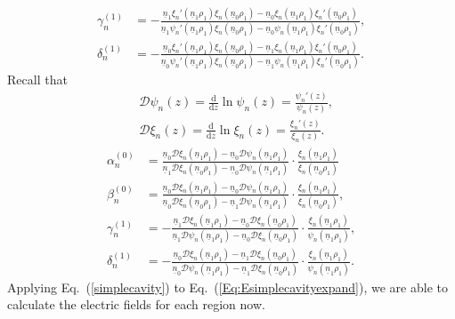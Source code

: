 \documentclass[journal=jacsat,manuscript=article,layout=traditional]{achemso}
\newcommand{\nr}{\underline{n}}
\begin{document}
\begin{appendix}
\begin{subequations}
\begin{align}
        \gamma_n^{(1)} &=-
        \frac{\nr_1\xi_n'(\nr_1\rho_1)\xi_n(\nr_0\rho_1)-\nr_0\xi_n(\nr_1\rho_1)\xi_n'(\nr_0\rho_1)}
        {\nr_1\psi_n'(\nr_1\rho_1)\xi_n(\nr_0\rho_1)-\nr_0\psi_n(\nr_1\rho_1)\xi_n'(\nr_0\rho_1)},\\
        \delta_n^{(1)} &=-
        \frac{\nr_0\xi_n'(\nr_1\rho_1)\xi_n(\nr_0\rho_1)-\nr_1\xi_n(\nr_1\rho_1)\xi_n'(\nr_0\rho_1)}
        {\nr_0\psi_n'(\nr_1\rho_1)\xi_n(\nr_0\rho_1)-\nr_1\psi_n(\nr_1\rho_1)\xi_n'(\nr_0\rho_1)}.
    \end{align}
    \label{simplecavity}%
\end{subequations}
Recall that 
\begin{subequations}
    \begin{align}
        &\mathcal{D}\psi_n(z) = \frac{\mathrm{d}}{\mathrm{d}z}\ln{\psi_n(z)} = \frac{\psi_n'(z)}{\psi_n(z)},\\
        &\mathcal{D}\xi_n(z) = \frac{\mathrm{d}}{\mathrm{d}z}\ln{\xi_n(z)} = \frac{\xi_n'(z)}{\xi_n(z)}.
    \end{align}%
\end{subequations}
\begin{subequations}
    \begin{align}
        \alpha_n^{(0)} &=
        \frac{\nr_0\mathcal{D}\xi_n(\nr_1\rho_1)-\nr_0\mathcal{D}\psi_n(\nr_1\rho_1)}
        {\nr_1\mathcal{D}\xi_n(\nr_0\rho_1)-\nr_0\mathcal{D}\psi_n(\nr_1\rho_1)}\cdot\frac{\xi_n(\nr_1\rho_1)}{\xi_n(\nr_0\rho_1)}\\
        \beta_n^{(0)} &=
        \frac{\nr_0\mathcal{D}\xi_n(\nr_1\rho_1)-\nr_0\mathcal{D}\psi_n(\nr_1\rho_1)}
        {\nr_0\mathcal{D}\xi_n(\nr_0\rho_1)-\nr_1\mathcal{D}\psi_n(\nr_1\rho_1)}\cdot\frac{\xi_n(\nr_1\rho_1)}{\xi_n(\nr_0\rho_1)},\\
        \gamma_n^{(1)} &=-
        \frac{\nr_1\mathcal{D}\xi_n(\nr_1\rho_1)-\nr_0\mathcal{D}\xi_n(\nr_0\rho_1)}
        {\nr_1\mathcal{D}\psi_n(\nr_1\rho_1)-\nr_0\mathcal{D}\xi_n(\nr_0\rho_1)}
        \cdot\frac{\xi_n(\nr_1\rho_1)}{\psi_n(\nr_1\rho_1)},\\
        \delta_n^{(1)} &=-
        \frac{\nr_0\mathcal{D}\xi_n(\nr_1\rho_1)-\nr_1\mathcal{D}\xi_n(\nr_0\rho_1)}
        {\nr_0\mathcal{D}\psi_n(\nr_1\rho_1)-\nr_1\mathcal{D}\xi_n(\nr_0\rho_1)}
        \cdot\frac{\xi_n(\nr_1\rho_1)}{\psi_n(\nr_1\rho_1)}.
    \end{align}
\end{subequations}
Applying Eq.~(\ref{simplecavity}) to Eq.~(\ref{Eq:Esimplecavityexpand}), we are able to calculate the electric fields for each region now.

\end{appendix}
\end{document}
